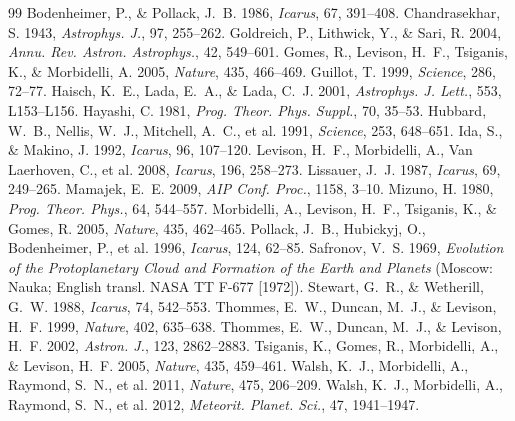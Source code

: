 \documentclass[11pt,a4paper]{article}
\begin{document}
\begin{thebibliography}{99}
 Bodenheimer, P., \& Pollack, J.~B. 1986, \textit{Icarus}, 67, 391--408.
 Chandrasekhar, S. 1943, \textit{Astrophys. J.}, 97, 255--262.
 Goldreich, P., Lithwick, Y., \& Sari, R. 2004, \textit{Annu. Rev. Astron. Astrophys.}, 42, 549--601.
 Gomes, R., Levison, H.~F., Tsiganis, K., \& Morbidelli, A. 2005, \textit{Nature}, 435, 466--469.
 Guillot, T. 1999, \textit{Science}, 286, 72--77.
 Haisch, K.~E., Lada, E.~A., \& Lada, C.~J. 2001, \textit{Astrophys. J. Lett.}, 553, L153--L156.
 Hayashi, C. 1981, \textit{Prog. Theor. Phys. Suppl.}, 70, 35--53.
 Hubbard, W.~B., Nellis, W.~J., Mitchell, A.~C., et al. 1991, \textit{Science}, 253, 648--651.
 Ida, S., \& Makino, J. 1992, \textit{Icarus}, 96, 107--120.
 Levison, H.~F., Morbidelli, A., Van Laerhoven, C., et al. 2008, \textit{Icarus}, 196, 258--273.
 Lissauer, J.~J. 1987, \textit{Icarus}, 69, 249--265.
 Mamajek, E.~E. 2009, \textit{AIP Conf. Proc.}, 1158, 3--10.
 Mizuno, H. 1980, \textit{Prog. Theor. Phys.}, 64, 544--557.
 Morbidelli, A., Levison, H.~F., Tsiganis, K., \& Gomes, R. 2005, \textit{Nature}, 435, 462--465.
 Pollack, J.~B., Hubickyj, O., Bodenheimer, P., et al. 1996, \textit{Icarus}, 124, 62--85.
 Safronov, V.~S. 1969, \textit{Evolution of the Protoplanetary Cloud and Formation of the Earth and Planets} (Moscow: Nauka; English transl. NASA TT F-677 [1972]).
 Stewart, G.~R., \& Wetherill, G.~W. 1988, \textit{Icarus}, 74, 542--553.
 Thommes, E.~W., Duncan, M.~J., \& Levison, H.~F. 1999, \textit{Nature}, 402, 635--638.
 Thommes, E.~W., Duncan, M.~J., \& Levison, H.~F. 2002, \textit{Astron. J.}, 123, 2862--2883.
 Tsiganis, K., Gomes, R., Morbidelli, A., \& Levison, H.~F. 2005, \textit{Nature}, 435, 459--461.
 Walsh, K.~J., Morbidelli, A., Raymond, S.~N., et al. 2011, \textit{Nature}, 475, 206--209.
 Walsh, K.~J., Morbidelli, A., Raymond, S.~N., et al. 2012, \textit{Meteorit. Planet. Sci.}, 47, 1941--1947.
\end{thebibliography}

\appendix
\end{document}
